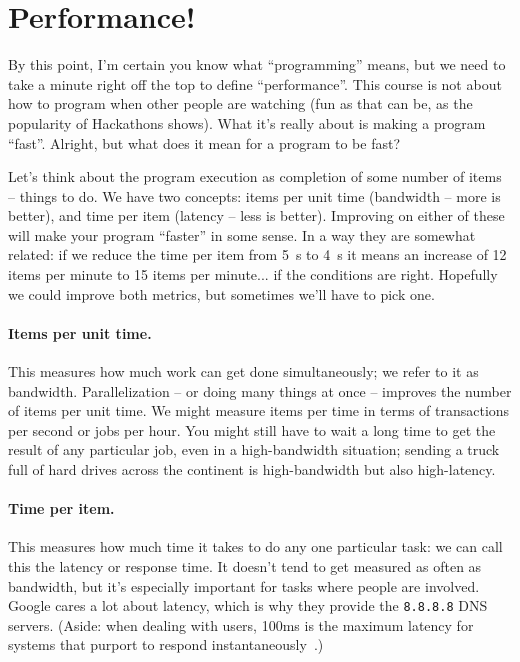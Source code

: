 




\section*{Performance!}
By this point, I'm certain you know what ``programming'' means, but we need to take a minute right off the top to define ``performance''. This course is not about how to program when other people are watching (fun as that can be, as the popularity of Hackathons shows). What it's really about is making a program ``fast''. Alright, but what does it mean for a program to be fast?

Let's think about the program execution as completion of some number of items -- things to do. We have two concepts: items per unit time (bandwidth -- more is better), and time per item (latency -- less is better). Improving on either of these will make your program ``faster'' in some sense. In a way they are somewhat related: if we reduce the time per item from 5~s to 4~s it means an increase of 12 items per minute to 15 items per minute... if the conditions are right. Hopefully we could improve both metrics, but sometimes we'll have to pick one.

\paragraph{Items per unit time.} This measures how much work can get 
done simultaneously; we refer to it as bandwidth.
Parallelization -- or doing many things at once -- improves the number
of items per unit time. We might measure items per time in terms of
transactions per second or jobs per hour. You might still have to wait
a long time to get the result of any particular job, even in a
high-bandwidth situation; sending a truck full of hard drives across
the continent is high-bandwidth but also high-latency.

\paragraph{Time per item.} This measures how much time it takes to do
any one particular task: we can call this the latency or response time.
It doesn't tend to get measured as often as bandwidth, but it's especially
important for tasks where people are involved. Google cares a lot about
latency, which is why they provide the {\tt 8.8.8.8} DNS servers.
(Aside: when dealing with users, 100ms is the maximum latency for
systems that purport to respond instantaneously~\cite{nielsen93:_respon_times}.)


